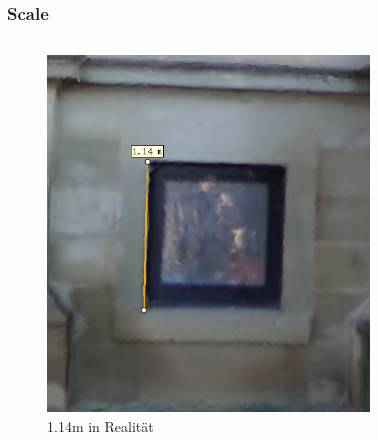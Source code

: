 \documentclass{beamer}
\begin{document}
	\begin{frame}
	\frametitle{Scale}

	
	\begin{columns}
		
		\begin{figure}
			\includegraphics[scale=0.45]{Skale (In-Situ 1.14m)}
			\caption{1.14m in Realität}
		\end{figure}
		\vspace{20pt}
		\begin{figure}

\end{figure}
\end{columns}
\end{frame}
\end{document}
